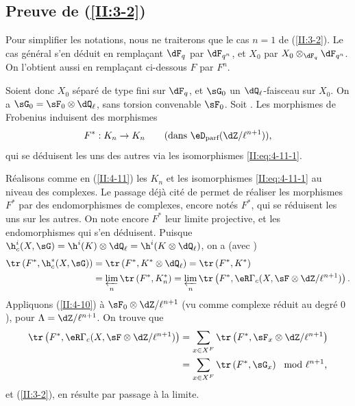 \subsection{Preuve de \texorpdfstring{(\ref{II:3-2})}{(3.2)}}\label{II:4-13}

Pour simplifier les notations, nous ne traiterons que le cas $n=1$ de 
(\ref{II:3-2}). Le cas général s'en déduit en remplaçant $\dF_q$ par $\dF_{q^n}$, et $X_0$ par $X_0\otimes_{\dF_q}\dF_{q^n}$. On l'obtient aussi en remplaçant ci-dessous 
$F$ par $F^n$. 

Soient donc $X_0$ séparé de type fini sur $\dF_q$, et $\sG_0$ un 
$\dQ_\ell$-faisceau sur $X_0$. On a $\sG_0=\sF_0\otimes\dQ_\ell$,  sans torsion convenable $\sF_0$. Soit 
. Les morphismes de Frobenius induisent 
des morphismes 
\[
  F^* : K_n\to K_n \qquad \text{(dans $\eD_\text{parf}(\dZ/\ell^{n+1})$),}
\]
qui se déduisent les uns des autres via les isomorphismes 
\eqref{II:eq:4-11-1}. 

Réalisons comme en (\ref{II:4-11}) les $K_n$ et les isomorphismes 
\eqref{II:eq:4-11-1} au niveau des complexes. Le passage déjà cité de 
 permet de réaliser les morphismes $F^*$ par des 
endomorphismes de complexes, encore notés $F^*$, qui se réduisent les uns 
sur les autres. On note encore $F^*$ leur limite projective, et les 
endomorphismes qui s'en déduisent. Puisque 
$\h_c^i(X,\sG) = \h^i(K)\otimes\dQ_\ell = \h^i(K\otimes\dQ_\ell)$, on a (avec 
) 
\begin{align*}
  \tr\left(F^*, \h_c^*(X,\sG)\right) &= \tr\left(F^*,K^*\otimes\dQ_\ell\right) = \tr\left(F^*,K^*\right) \\
  &= \varprojlim_n \tr\left(F^*,K_n^*\right) = \varprojlim_n \tr\left(F^*,\eR\Gamma_c(X,\sF\otimes\dZ/\ell^{n+1})\right) \text{.}
\end{align*}
Appliquons (\ref{II:4-10}) à $\sF_0\otimes\dZ/\ell^{n+1}$ (vu comme complexe 
réduit au degré $0$), pour $\Lambda=\dZ/\ell^{n+1}$. On trouve que 
\begin{align*}
  \tr\left(F^*,\eR\Gamma_c(X,\sF\otimes\dZ/\ell^{n+1})\right) 
    &= \sum_{x\in X^F} \tr\left(F^*,\sF_x\otimes\dZ/\ell^{n+1}\right) \\
    &= \sum_{x\in X^F} \tr\left(F^*,\sG_x\right) \mod \ell^{n+1} \text{,}
\end{align*}
et (\ref{II:3-2}), en résulte par passage à la limite. 










